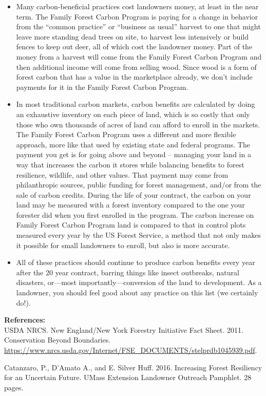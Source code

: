 \documentclass{article}\usepackage[]{graphicx}\usepackage[]{color}
\begin{document}
\begin{itemize}
  \item Many carbon-beneficial practices cost landowners money, at least in the near term. The Family Forest Carbon Program is paying for a change in behavior from the ``common practice'' or ``business as usual'' harvest to one that might leave more standing dead trees on site, to harvest less intensively or build fences to keep out deer, all of which cost the landowner money. Part of the money from a harvest will come from the Family Forest Carbon Program and then additional income will come from selling wood. Since wood is a form of forest carbon that has a value in the marketplace already, we don't include payments for it in the Family Forest Carbon Program.
  
  \item In most traditional carbon markets, carbon benefits are calculated by doing an exhaustive inventory on each piece of land, which is so costly that only those who own thousands of acres of land can afford to enroll in the markets. The Family Forest Carbon Program uses a different and more flexible approach, more like that used by existing state and federal programs. The payment you get is for going above and beyond -- managing your land in a way that increases the carbon it stores while balancing benefits to forest resilience, wildlife, and other values. That payment may come from philanthropic sources, public funding for forest management, and/or from the sale of carbon credits. During the life of your contract, the carbon on your land may be measured with a forest inventory compared to the one your forester did when you first enrolled in the program. The carbon increase on Family Forest Carbon Program land is compared to that in control plots measured every year by the US Forest Service, a method that not only makes it possible for small landowners to enroll, but also is more accurate.

  \item All of these practices should continue to produce carbon benefits every year after the 20 year contract, barring things like insect outbreaks, natural disasters, or---most importantly---conversion of the land to development. As a landowner, you should feel good about any practice on this list (we certainly do!).
  \end{itemize}

{\Large{\textbf{References:}}} \\

USDA NRCS. New England/New York Forestry Initiative Fact Sheet. 2011. Conservation Beyond Boundaries. \url{https://www.nrcs.usda.gov/Internet/FSE_DOCUMENTS/stelprdb1045939.pdf}.

Catanzaro, P., D'Amato A., and E. Silver Huff. 2016. Increasing Forest Resiliency for an Uncertain Future. UMass Extension Landowner Outreach Pamphlet. 28 pages.
\end{document}
